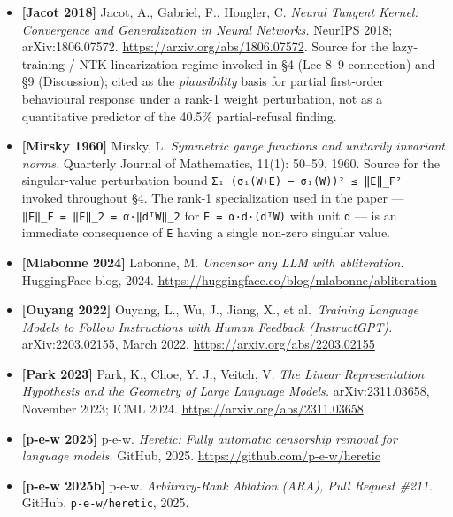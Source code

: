 \documentclass[
  11pt,
]{article}
\begin{document}
\begin{itemize}
  Mathematical Journal, 20(1): 37--39, 1953. The original eigenvalue
  perturbation bound for normal matrices; §4 notes that the rectangular
  \texttt{o\_proj} / \texttt{down\_proj} weights fall outside its scope
  and that Mirsky's singular-value generalization is required instead.
\item
  \textbf{{[}Jacot 2018{]}} Jacot, A., Gabriel, F., Hongler, C.
  \emph{Neural Tangent Kernel: Convergence and Generalization in Neural
  Networks.} NeurIPS 2018; arXiv:1806.07572.
  \url{https://arxiv.org/abs/1806.07572}. Source for the lazy-training /
  NTK linearization regime invoked in §4 (Lec 8--9 connection) and §9
  (Discussion); cited as the \emph{plausibility} basis for partial
  first-order behavioural response under a rank-1 weight perturbation,
  not as a quantitative predictor of the 40.5\% partial-refusal finding.
\item
  \textbf{{[}Mirsky 1960{]}} Mirsky, L. \emph{Symmetric gauge functions
  and unitarily invariant norms.} Quarterly Journal of Mathematics,
  11(1): 50--59, 1960. Source for the singular-value perturbation bound
  \texttt{Σᵢ\ (σᵢ(W+E)\ −\ σᵢ(W))²\ ≤\ ‖E‖\_F²} invoked throughout §4.
  The rank-1 specialization used in the paper ---
  \texttt{‖E‖\_F\ =\ ‖E‖\_2\ =\ \textbar{}α\textbar{}·‖dᵀW‖\_2} for
  \texttt{E\ =\ α·d·(dᵀW)} with unit \texttt{d} --- is an immediate
  consequence of \texttt{E} having a single non-zero singular value.
\item
  \textbf{{[}Mlabonne 2024{]}} Labonne, M. \emph{Uncensor any LLM with
  abliteration.} HuggingFace blog, 2024.
  \url{https://huggingface.co/blog/mlabonne/abliteration}
\item
  \textbf{{[}Ouyang 2022{]}} Ouyang, L., Wu, J., Jiang, X., et
  al.~\emph{Training Language Models to Follow Instructions with Human
  Feedback (InstructGPT).} arXiv:2203.02155, March 2022.
  \url{https://arxiv.org/abs/2203.02155}
\item
  \textbf{{[}Park 2023{]}} Park, K., Choe, Y. J., Veitch, V. \emph{The
  Linear Representation Hypothesis and the Geometry of Large Language
  Models.} arXiv:2311.03658, November 2023; ICML 2024.
  \url{https://arxiv.org/abs/2311.03658}
\item
  \textbf{{[}p-e-w 2025{]}} p-e-w. \emph{Heretic: Fully automatic
  censorship removal for language models.} GitHub, 2025.
  \url{https://github.com/p-e-w/heretic}
\item
  \textbf{{[}p-e-w 2025b{]}} p-e-w. \emph{Arbitrary-Rank Ablation (ARA),
  Pull Request \#211.} GitHub, \texttt{p-e-w/heretic}, 2025.

\end{itemize}
\end{document}
